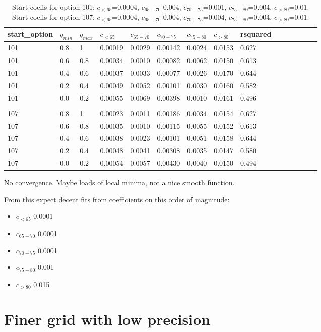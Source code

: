 \documentclass[12pt]{extarticle}
\begin{document}
\begin{table}[h]
\centering
\begin{tabular}{l l l l l l l l l l l l l l l}
start\_option & $q_{min}$ & $q_{max}$ & $c_{<65}$ & $c_{65-70}$ & $c_{70-75}$ & $c_{75-80}$ & $c_{>80}$ & rsquared \\
\hline
101 & 0.8 & 1 & 0.00019 & 0.0029 & 0.00142 & 0.0024 & 0.0153 & 0.627 \\
101 & 0.6 & 0.8 & 0.00034 & 0.0010 & 0.00082 & 0.0062 & 0.0150 & 0.613 \\
101 & 0.4 & 0.6 & 0.00037 & 0.0033 & 0.00077 & 0.0026 & 0.0170 & 0.644 \\
101 & 0.2 & 0.4 & 0.00049 & 0.0052 & 0.00101 & 0.0030 & 0.0160 & 0.582 \\
101 & 0.0 & 0.2 & 0.00055 & 0.0069 & 0.00398 & 0.0010 & 0.0161 & 0.496 \\
\\
107 & 0.8 & 1 & 0.00023 & 0.0011 & 0.00186 & 0.0034 & 0.0154 & 0.627 \\
107 & 0.6 & 0.8 & 0.00035 & 0.0010 & 0.00115 & 0.0055 & 0.0152 & 0.613 \\
107 & 0.4 & 0.6 & 0.00038 & 0.0023 & 0.00101 & 0.0051 & 0.0158 & 0.644 \\
107 & 0.2 & 0.4 & 0.00048 & 0.0041 & 0.00308 & 0.0035 & 0.0147 & 0.580 \\
107 & 0.0 & 0.2 & 0.00054 & 0.0057 & 0.00430 & 0.0040 & 0.0150 & 0.494 
\end{tabular}
    \caption{Start coeffs for option 101: $c_{<65}$=0.0004, $c_{65-70}$ 0.004, $c_{70-75}$=0.001, $c_{75-80}$=0.004, $c_{>80}$=0.01. Start coeffs for option 107: $c_{<65}$=0.0004, $c_{65-70}$ 0.004, $c_{70-75}$=0.004, $c_{75-80}$=0.004, $c_{>80}$=0.01.}
    \label{tab:optimised_grid_results}
\end{table}

No convergence. Maybe loads of local minima, not a nice smooth function.

From this expect decent fits from coefficients on this order of magnitude:
\begin{itemize}
    \item $c_{<65}$ 0.0001
    \item $c_{65-70}$ 0.0001
    \item $c_{70-75}$ 0.0001
    \item $c_{75-80}$ 0.001
    \item $c_{>80}$ 0.015
\end{itemize}


\section{Finer grid with low precision}
\end{document}
